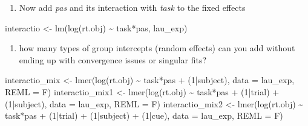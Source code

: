 \documentclass[
]{article}
\newenvironment{Shaded}{\begin{snugshade}}{\end{snugshade}}
\newcommand{\AttributeTok}[1]{\textcolor[rgb]{0.77,0.63,0.00}{#1}}
\newcommand{\DecValTok}[1]{\textcolor[rgb]{0.00,0.00,0.81}{#1}}
\newcommand{\FunctionTok}[1]{\textcolor[rgb]{0.00,0.00,0.00}{#1}}
\newcommand{\NormalTok}[1]{#1}
\newcommand{\OtherTok}[1]{\textcolor[rgb]{0.56,0.35,0.01}{#1}}
\newcommand{\SpecialCharTok}[1]{\textcolor[rgb]{0.00,0.00,0.00}{#1}}
\providecommand{\tightlist}{%
  \setlength{\itemsep}{0pt}\setlength{\parskip}{0pt}}
\begin{document}
\begin{enumerate}
\def\labelenumi{\arabic{enumi})}
\setcounter{enumi}{2}
\tightlist
\item
  Now add \emph{pas} and its interaction with \emph{task} to the fixed
  effects
\end{enumerate}

\begin{Shaded}
\begin{Highlighting}[]
\NormalTok{interactio }\OtherTok{\textless{}{-}} \FunctionTok{lm}\NormalTok{(}\FunctionTok{log}\NormalTok{(rt.obj) }\SpecialCharTok{\textasciitilde{}}\NormalTok{ task}\SpecialCharTok{*}\NormalTok{pas, lau\_exp)}
\end{Highlighting}
\end{Shaded}

\begin{enumerate}
\def\labelenumi{\roman{enumi}.}
\tightlist
\item
  how many types of group intercepts (random effects) can you add
  without ending up with convergence issues or singular fits?
\end{enumerate}

\begin{Shaded}
\begin{Highlighting}[]
\NormalTok{interactio\_mix }\OtherTok{\textless{}{-}} \FunctionTok{lmer}\NormalTok{(}\FunctionTok{log}\NormalTok{(rt.obj) }\SpecialCharTok{\textasciitilde{}}\NormalTok{ task}\SpecialCharTok{*}\NormalTok{pas }\SpecialCharTok{+}\NormalTok{ (}\DecValTok{1}\SpecialCharTok{|}\NormalTok{subject), }\AttributeTok{data =}\NormalTok{ lau\_exp, }\AttributeTok{REML =}\NormalTok{ F)}
\NormalTok{interactio\_mix1 }\OtherTok{\textless{}{-}} \FunctionTok{lmer}\NormalTok{(}\FunctionTok{log}\NormalTok{(rt.obj) }\SpecialCharTok{\textasciitilde{}}\NormalTok{ task}\SpecialCharTok{*}\NormalTok{pas }\SpecialCharTok{+}\NormalTok{ (}\DecValTok{1}\SpecialCharTok{|}\NormalTok{trial) }\SpecialCharTok{+}\NormalTok{ (}\DecValTok{1}\SpecialCharTok{|}\NormalTok{subject), }\AttributeTok{data =}\NormalTok{ lau\_exp, }\AttributeTok{REML =}\NormalTok{ F)}
\NormalTok{interactio\_mix2 }\OtherTok{\textless{}{-}} \FunctionTok{lmer}\NormalTok{(}\FunctionTok{log}\NormalTok{(rt.obj) }\SpecialCharTok{\textasciitilde{}}\NormalTok{ task}\SpecialCharTok{*}\NormalTok{pas }\SpecialCharTok{+}\NormalTok{ (}\DecValTok{1}\SpecialCharTok{|}\NormalTok{trial) }\SpecialCharTok{+}\NormalTok{ (}\DecValTok{1}\SpecialCharTok{|}\NormalTok{subject) }\SpecialCharTok{+}\NormalTok{ (}\DecValTok{1}\SpecialCharTok{|}\NormalTok{cue), }\AttributeTok{data =}\NormalTok{ lau\_exp, }\AttributeTok{REML =}\NormalTok{ F)}
\end{Highlighting}
\end{Shaded}
\end{document}
